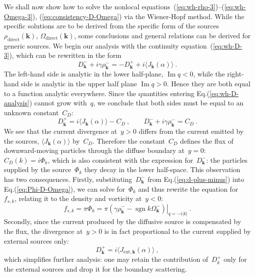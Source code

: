 \documentclass[preprint,aps,eqsecnum]{revtex4-1}
\newcommand{\fplus}[1]{{#1}^{+}}
\newcommand{\fminus}[1]{{#1}^{-}}
\renewcommand{\Im}{\mathop{\mathrm{Im}}\nolimits}
\newcommand{\sgn}{\mathop{\mathrm{sgn}}\nolimits}
\newcommand{\dct}[1]{{#1}_\mathrm{direct}}
\begin{document}
We shall now show how to solve the nonlocal
equations~(\ref{eq:wh-rho-3})--(\ref{eq:wh-Omega-3}),
(\ref{eq:consistency-D-Omega})
via the Wiener-Hopf method. While the specific solutions
are to be derived from the specific form of the sources
$\dct{\rho}({\bm k})$, $\dct{\Omega}({\bm k})$,  some conclusions
and general relations can be derived for generic sources.
We begin our analysis with the continuity
equation~(\ref{eq:wh-D-3}), which can be rewritten  in the form
\begin{equation}
  \label{eq:wh-D-analysis}
  \fminus{D}_{\bm k} + i \gamma \fminus{\rho}_{\bm k}
      = - \fplus{D}_{\bm k} + i \langle J_{\bm k}(\alpha) \rangle \ .
\end{equation}
The left-hand side is analytic in the lower half-plane, $\Im q < 0$,
while the right-hand side is analytic in the upper half plane $\Im q > 0$.
Hence they are both equal to a function analytic everywhere.
Since the quantities entering Eq.(\ref{eq:wh-D-analysis}) cannot grow with~$q$,
we conclude that both sides must be equal to an unknown constant~$C_D$:
\begin{equation}
  \label{eq:d-plus-minus}
\fplus{D}_{\bm k} = i  \langle J_{\bm k}(\alpha) \rangle - C_D\ ,
\qquad
\fminus{D}_{\bm k} + i \gamma \fminus{\rho}_{\bm k} = C_D  \ .
\end{equation}
We see that the current divergence at~$y > 0$ differs from the current emitted by
the sources, $\langle J_{\bm k}(\alpha) \rangle$ by~$C_D$.
Therefore the constant~$C_D$ defines
the flux of downward-moving particles through the diffuse boundary
at~$y = 0$: $C_D(k) = i\Phi_{k}$, which is also consistent
with the expression for~$\fminus{D}_{\bm k}$: the particles
supplied by the source~$\Phi_{k}$ they decay in the lower
half-space.
This observation has two consequences.
Firstly, substituting~$\fminus{D}_{\bm k}$ from Eq.(\ref{eq:d-plus-minus})
into Eq.(\ref{eq:Phi-D-Omega}), we can solve for~$\Phi_{k}$ and thus
rewrite the equation for~$f_{s, k}$,
relating it to the density and vorticity at~$y < 0$:
\begin{equation}
  \label{eq:flux-rho-Omega}
  f_{s, k} = \pi \Phi_{k} = \pi \left. \left(\gamma \fminus{\rho}_{\bm k}
                        - \sgn k \fminus{\Omega}_{\bm k}
                        \right)\right|_{q = -i |k|}
  \ .
\end{equation}
Secondly, since the current produced by the diffusive source is compensated
by the flux, the divergence at~$y > 0$ is in fact proportional to the current
supplied by external sources only:
\begin{equation}
  \label{eq:solution-D}
 \fplus{D}_{\bm k} = i \langle J_{\mathrm{ext}, {\bm k}}(\alpha) \rangle
 \ ,
\end{equation}
which simplifies further analysis: one may retain the
contribution of~$\fplus{D}_{k}$ only for the external sources and
drop it for the boundary scattering.
\end{document}
